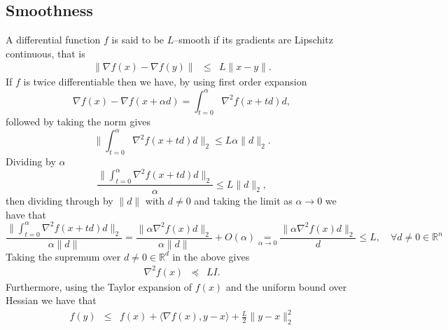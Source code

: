 \documentclass[11pt]{article}
\newcommand{\R}{\mathbb{R}}
\newcommand{\norm}[1]{\lVert#1\rVert}
\begin{document}
\subsection{Smoothness}
A differential function $f$ is said to be $L$--smooth if its gradients are Lipschitz continuous, that is
\begin{eqnarray}\label{eq:smoothness}
\norm{\nabla f(x)- \nabla f(y)} &\leq & L \norm{x-y}.
 \end{eqnarray}
If $f$ is twice differentiable then we have, by using first order expansion
\[ \nabla f(x) - \nabla f(x+\alpha d) = \int_{t=0}^\alpha \nabla^2 f(x + td)d,\]
followed by taking the norm gives
\[\norm{\int_{t=0}^\alpha \nabla^2 f(x + td)d}_2 \leq L  \alpha \norm{d}_2.\]
Dividing by $\alpha$  
\[\frac{\norm{\int_{t=0}^\alpha \nabla^2 f(x + td)d}_2}{\alpha} \leq L \norm{d}_2,\]
then dividing through by $\norm{d}$ with $d \neq 0$ and taking the limit as $\alpha \rightarrow 0$ we have that
\[\frac{\norm{\int_{t=0}^\alpha \nabla^2 f(x + td)d}_2}{\alpha\norm{d}} =   \frac{\norm{\alpha \nabla^2 f(x)d}_2}{\alpha\norm{d}}+ O(\alpha) 
\underset{\alpha \rightarrow 0}{=} \frac{\norm{\alpha \nabla^2 f(x)d}_2}{{d}} \leq L, \quad \forall d \neq 0 \in \R^n\]
Taking the supremum  over $d \neq 0 \in \R^d$ in the above gives
\begin{eqnarray}\label{eq:smoothnesshess}
\nabla ^2 f(x) &\preceq & L I.
 \end{eqnarray}
 Furthermore, using the Taylor expansion of $f(x)$ and the uniform bound over Hessian we have that
\begin{eqnarray}\label{eq:smoothnessfunc}
 f(y) &\leq & f(x) + \langle \nabla f(x), y-x \rangle + \frac{L}{2} \norm{y-x}_2^2
 \end{eqnarray}
\end{document}
